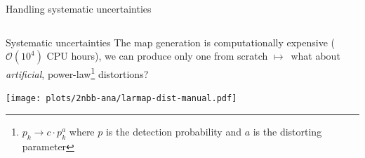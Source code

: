 \documentclass[10pt,aspectratio=169]{beamer}
\newcommand{\arrow}{$\longmapsto$}
\begin{document}
\begin{frame}{Handling systematic uncertainties}
\begin{columns}
\begin{column}{0.15\textwidth}
\begin{center}
      \end{center}
    \end{column}
  \end{columns}
\end{frame}
\begin{frame}{Systematic uncertainties}
  The map generation is computationally expensive ($\mathcal{O}{(10^4)}$ CPU
  hours), we can produce only one from scratch \arrow\ what about
  \emph{artificial}, power-law\footnote{$p_k \rightarrow c \cdot p_k^a$ where
  $p$ is the detection probability and $a$ is the distorting parameter}
  distortions?
  \begin{center}
    \texttt{[image: plots/2nbb-ana/larmap-dist-manual.pdf]}
  \end{center}
\end{frame}
\end{document}

